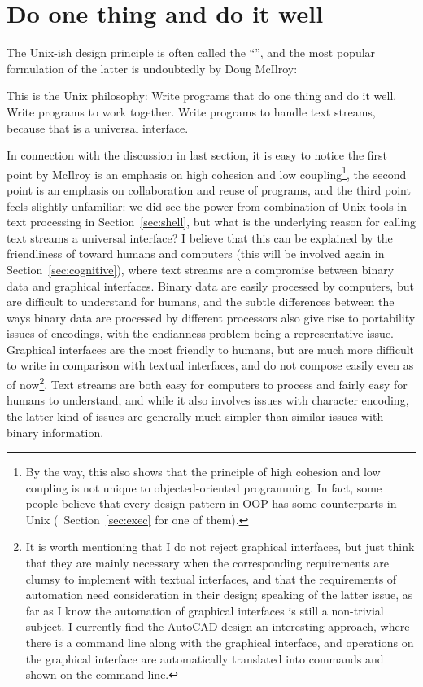 \section{Do one thing and do it well}\label{sec:mcilroy}

The Unix-ish design principle is often called the ``'',
and the most popular formulation of the latter is undoubtedly
by Doug McIlroy:
\begin{quoting}
	This is the Unix philosophy:  Write programs that do one thing and
	do it well.  Write programs to work together.  Write programs to
	handle text streams, because that is a universal interface.
\end{quoting}

In connection with the discussion in last section, it is easy to
notice the first point by McIlroy is an emphasis on high cohesion and low
coupling\footnote{By the way, this also shows that the principle of high
cohesion and low coupling is not unique to objected-oriented programming.
In fact, some people believe that every design pattern
in OOP has some counterparts in Unix (\cf~Section~\ref{sec:exec} for one of
them).}, the second point is an emphasis on collaboration and reuse of
programs, and the third point feels slightly unfamiliar: we did see the power
from combination of Unix tools in text processing in Section~\ref{sec:shell},
but what is the underlying reason for calling text streams a universal
interface?  I believe that this can be explained by the friendliness of
 toward humans and computers (this will
be involved again in Section~\ref{sec:cognitive}), where text streams are a
compromise between binary data and graphical interfaces.  Binary data are easily
processed by computers, but are difficult to understand for humans, and the
subtle differences between the ways binary data are processed by different
processors also give rise to portability issues of encodings, with the
endianness problem being a representative issue.  Graphical interfaces are
the most friendly to humans, but are much more difficult to write in comparison
with textual interfaces, and do not compose easily even as of now\footnote{It
is worth mentioning that I do not reject graphical interfaces, but just think
that they are mainly necessary when the corresponding requirements are clumsy
to implement with textual interfaces, and that the requirements of automation
need consideration in their design; speaking of the latter issue, as far
as I know the automation of graphical interfaces is still a non-trivial
subject.  I currently find the AutoCAD design an interesting approach, where
there is a command line along with the graphical interface, and operations on
the graphical interface are automatically translated into commands and shown
on the command line.}.  Text streams are both easy for computers to process
and fairly easy for humans to understand, and while it also involves issues
with character encoding, the latter kind of issues are generally
much simpler than similar issues with binary information.

